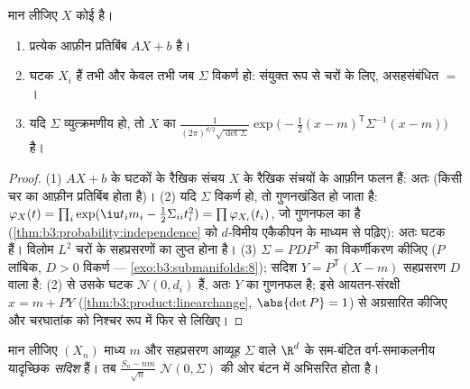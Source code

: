 \begin{theorem}\label{thm:b3:clt:gaussianvector}
मान लीजिए $X$ कोई  है।
\begin{enumerate}
  \item प्रत्येक आफ़ीन प्रतिबिंब $AX + b$  है।
  \item घटक $X_i$ \emph{} हैं तभी और केवल तभी जब $\Sigma$
        विकर्ण हो: संयुक्त रूप से  चरों के लिए, असहसंबंधित
        $=$ ।
  \item यदि $\Sigma$ व्युत्क्रमणीय हो, तो $X$ का  $\frac{1}{(2\pi)^{d/2}\sqrt{\det\Sigma}}
        \exp\bigl(-\frac12(x - m)^{\mathsf T}\Sigma^{-1}(x -
        m)\bigr)$ है।
\end{enumerate}
\end{theorem}

\begin{proof}
(1) $AX + b$ के घटकों के रैखिक संचय $X$ के रैखिक संचयों के आफ़ीन फलन
हैं: अतः  (किसी  चर का आफ़ीन प्रतिबिंब  होता है)।
(2) यदि $\Sigma$ विकर्ण हो, तो  गुणनखंडित हो जाता है:
$\varphi_X(t) = \prod_i\exp(\iu t_im_i -
\frac12\Sigma_{ii}t_i^2) = \prod\varphi_{X_i}(t_i)$, जो गुणनफल  का  है (\cref{thm:b3:probability:independence} को
$d$-विमीय एकैकीपन के माध्यम से पढ़िए): अतः घटक  हैं।
विलोम  $L^2$ चरों के सहप्रसरणों का लुप्त होना है।
(3) $\Sigma = P D P^{\mathsf T}$ का विकर्णीकरण कीजिए ($P$ लांबिक, $D > 0$ विकर्ण ---
\cref{exo:b3:submanifolds:8}); सदिश $Y = P^{\mathsf T}(X - m)$ सहप्रसरण $D$ वाला  है: (2) से उसके घटक
 $\mathcal N(0, d_i)$ हैं, अतः $Y$ का  गुणनफल  है; इसे
आयतन-संरक्षी $x = m + PY$ (\cref{thm:b3:product:linearchange}, $\abs{\det P} = 1$) से अग्रसारित कीजिए और चरघातांक
को निश्चर रूप में फिर से लिखिए।
\end{proof}

\begin{theorem}[बहुविमीय केंद्रीय सीमा प्रमेय]
\label{thm:b3:clt:multiclt}
मान लीजिए $(X_n)$ माध्य $m$ और सहप्रसरण आव्यूह $\Sigma$ वाले $\R^d$ के
 सम-बंटित वर्ग-समाकलनीय यादृच्छिक \emph{सदिश} हैं। तब $\frac{S_n - nm}{\sqrt n}$
 $\mathcal N(0,
\Sigma)$ की ओर बंटन में अभिसरित होता
है।
\admitted
\end{theorem}

